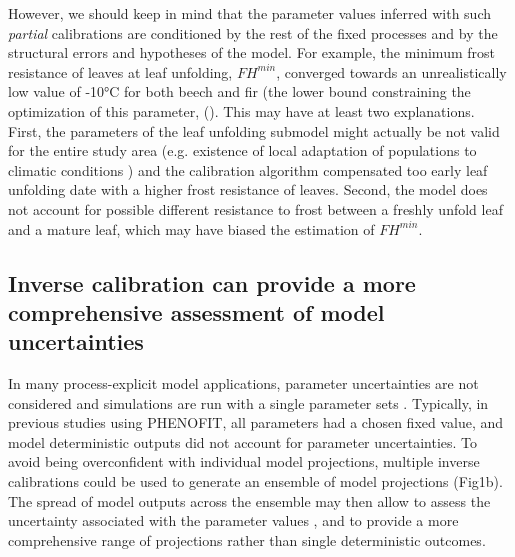\documentclass[letterpaper,8pt]{extarticle}  %
\begin{document}
\begin{doublespacing}
\begin{linenumbers}
However, we should keep in mind that the parameter values inferred with such \emph{partial} calibrations are conditioned by the rest of the fixed processes and by the structural errors and hypotheses of the model. For example, the minimum frost resistance of leaves at leaf unfolding, ${FH}^{min}$, converged towards an unrealistically low value of -10°C for both beech and fir (the lower bound constraining the optimization of this parameter, (). This may have at least two explanations. First, the parameters of the leaf unfolding submodel might actually be not valid for the entire study area (e.g. existence of local adaptation of populations to climatic conditions \citep{Kreyling2014}) and the calibration algorithm compensated too early leaf unfolding date with a higher frost resistance of leaves. Second, the model does not account for possible different resistance to frost between a freshly unfold leaf and a mature leaf, which may have biased the estimation of ${FH}^{min}$.  


\subsection{Inverse calibration can provide a more comprehensive assessment of model uncertainties}

In many process-explicit model applications, parameter uncertainties are not considered and simulations are run with a single parameter sets \citep{Niu2014, Lobell2010}. Typically, in previous studies using PHENOFIT, all parameters had a chosen fixed value, and model deterministic outputs did not account for parameter uncertainties. To avoid being overconfident with individual model projections, multiple inverse calibrations could be used to generate an ensemble of model projections (Fig1b). The spread of model outputs across the ensemble may then allow to assess the uncertainty associated with the parameter values \citep{Simmonds2024}, and to provide a more comprehensive range of projections rather than single deterministic outcomes.


\end{linenumbers}
\end{doublespacing}
\end{document}
